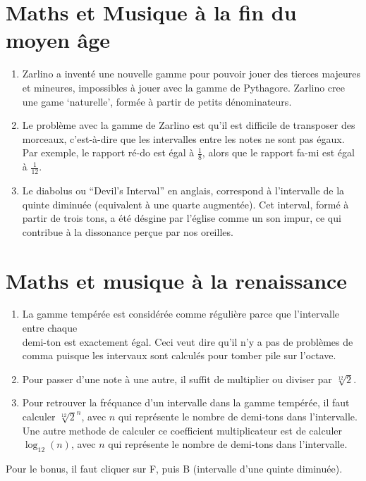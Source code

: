 \documentclass[12pt]{article}
\begin{document}
\pagebreak

\section{Maths et Musique à la fin du moyen âge}
    \begin{enumerate}
        \item Zarlino a inventé une nouvelle gamme pour pouvoir jouer des tierces majeures et mineures, impossibles à jouer avec la gamme de Pythagore. Zarlino cree une game `naturelle', formée à partir de petits dénominateurs.
        \item Le problème avec la gamme de Zarlino est qu'il est difficile de transposer des morceaux, c'est-à-dire que les intervalles entre les notes ne sont pas égaux. Par exemple, le rapport ré-do est égal à $\frac{1}{8}$, alors que le rapport fa-mi est égal à $\frac{1}{12}$.
        \item Le diabolus ou ``Devil's Interval'' en anglais, correspond à l'intervalle de la quinte diminuée (equivalent à une quarte augmentée). Cet interval, formé à partir de trois tons, a été désgine par l'église comme un son impur, ce qui contribue à la dissonance perçue par nos oreilles.
    \end{enumerate}

\section{Maths et musique à la renaissance}
    \begin{enumerate}
        \item La gamme tempérée est considérée comme régulière parce que l'intervalle entre chaque \\ demi-ton est exactement égal. Ceci veut dire qu'il n'y a pas de problèmes de comma puisque les intervaux sont calculés pour tomber pile sur l'octave.
        \item Pour passer d'une note à une autre, il suffit de multiplier ou diviser par $\sqrt[12]{2}$.
        \item Pour retrouver la fréquance d'un intervalle dans la gamme tempérée, il faut calculer $\sqrt[12]{2}^n$, avec $n$ qui représente le nombre de demi-tons dans l'intervalle. Une autre methode de calculer ce coefficient multiplicateur est de calculer \quad $\log_{12}{\left(n\right)}$, avec $n$ qui représente le nombre de demi-tons dans l'intervalle.
    \end{enumerate}

    Pour le bonus, il faut cliquer sur F, puis B (intervalle d'une quinte diminuée).
\end{document}
